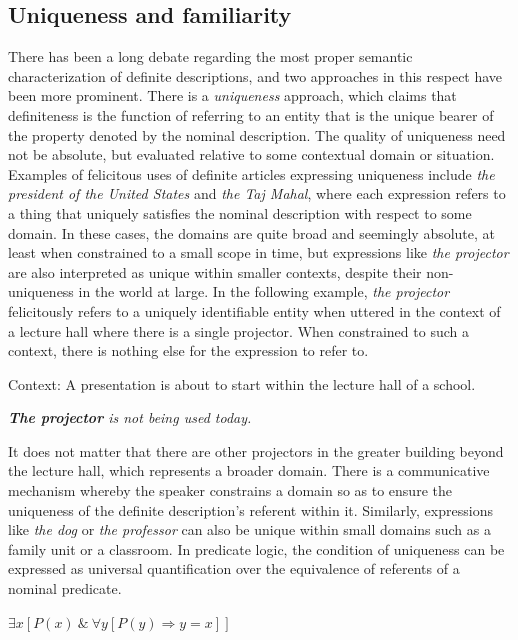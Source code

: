 \documentclass[output=paper,modfonts,nonflat]{langsci/langscibook}
\begin{document}
\subsection{Uniqueness and familiarity} \label{sec:cisneros:2.1}

There has been a long debate regarding the most proper semantic characterization of definite descriptions, and two approaches in this respect have been more prominent.  There is a \textit{uniqueness} approach, which claims that definiteness is the function of referring to an entity that is the unique bearer of the property denoted by the nominal description.  The quality of uniqueness need not be absolute, but evaluated relative to some contextual domain or situation.   Examples of felicitous uses of  definite articles expressing uniqueness include \textit{the president of the United States} and \textit{the Taj Mahal}, where each expression refers to a thing that uniquely satisfies the nominal description with respect to some domain.  In these cases, the domains are quite broad and seemingly absolute, at least when constrained to a small scope in time, but expressions like \textit{the projector} are also interpreted as unique within smaller contexts, despite their non-uniqueness in the world at large.  In the following example, \textit{the projector} felicitously refers to a uniquely identifiable entity when uttered in the context of a lecture hall where there is a single projector.  When constrained to such a context, there is nothing else for the expression to refer to.

\ea \label{ex:cisneros:3} 
Context: A presentation is about to start within the lecture hall of a school.

\textit{\textbf{The projector} is not being used today.} \citep[3]{Schwarz2013}
\z

It does not matter that there are other projectors in the greater building beyond the lecture hall, which represents a broader domain.  There is a communicative mechanism whereby the speaker constrains a domain so as to ensure the uniqueness of the definite description's referent within it.  Similarly, expressions like \textit{the dog} or \textit{the professor} can also be unique within small domains such as a family unit or a classroom.  In predicate logic, the condition of uniqueness can be expressed as universal quantification over the equivalence of referents of a nominal predicate.

\ea \label{ex:cisneros:4}
$\exists x[P(x)\ \&\ \forall y[P(y) \Rightarrow y = x]]$
\end{document}
